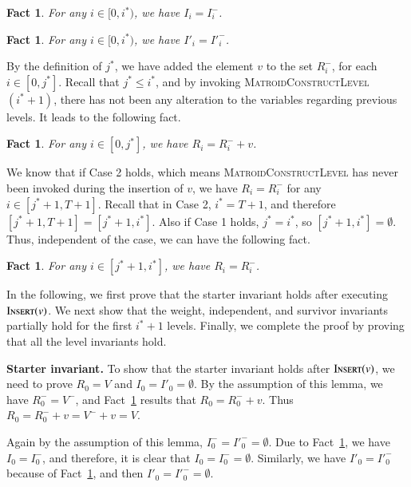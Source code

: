 \documentclass[11pt]{article}
\newtheorem{fact}[theorem]{Fact}
\newcommand{\MatroidConstLevel}{\textsc{MatroidConstructLevel}}
\newcommand{\insertv}{{\textsc{Insert}}}
\begin{document}
\begin{fact}
\label{fact:iprev:I}
For any $i \in [0, i^*)$, we have $I_i = I_i^-$.
\end{fact}

\begin{fact}
\label{fact:iprev:I'}
For any $i \in [0, i^*)$, we have ${I'}_i =  {I'}_i^-$. 
\end{fact}

By the definition of $j^*$, we have added the element $v$ to the set $R_i^-$, for each $i \in [0, j^*]$.
Recall that $j^* \leq i^*$, and by invoking \MatroidConstLevel$(i^* + 1)$, there has not been any alteration to the variables regarding previous levels. It leads to the following fact.
\begin{fact}
\label{fact:iprev:R+v}
For any $i \in [0, j^*]$, we have $R_i = R_i^- + v$.
\end{fact}

We know that if Case 2 holds, which means \MatroidConstLevel{} has never been invoked during the insertion of $v$, we have $R_i = R_i^-$  for any $i \in [j^* + 1, T + 1]$. Recall that in Case 2, $i^* = T + 1$, and therefore $[j^*+1, T+1] = [j^*+1, i^*]$. Also if Case 1 holds, $j^* = i^*$, so $[j^* + 1, i^*] = \emptyset$. Thus, independent of the case, we can have the following fact.

\begin{fact}
\label{fact:iprev:R}
 For any $i \in [j^*+1, i^*]$, we have $R_i = R_i^-$.
\end{fact}


In the following, we first prove that the starter invariant holds after executing $\insertv(v)$. We next show that the weight, independent, and survivor invariants partially hold for the first $i^*+1$ levels. Finally, we complete the proof by proving that all the level invariants hold.

\textbf{Starter invariant.}
To show that the starter invariant holds after $\insertv(v)$, we need to prove $R_0= V$ and $I_0={I'}_0=\emptyset$.
By the assumption of this lemma, we have $R_0^-=V^-$, and Fact~\ref{fact:iprev:R+v} results that $R_0 = R_0^- + v$. Thus $R_0 = R_0^- + v = V^- + v = V$.

Again by the assumption of this lemma, $I_0^-={I'}_0^-=\emptyset$.
Due to Fact~\ref{fact:iprev:I}, we have $I_0=I^-_0$, and therefore, it is clear that $I_0 = I_0^- = \emptyset$.
Similarly, we have ${I'}_0={I'}^-_0$ because of Fact~\ref{fact:iprev:I'}, and then ${I'}_0 = {I'}_0^- = \emptyset$.
\end{document}
